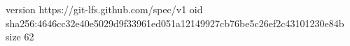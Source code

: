 version https://git-lfs.github.com/spec/v1
oid sha256:4646cc32e40e5029d9f33961ed051a12149927cb76be5c26ef2c43101230e84b
size 62
